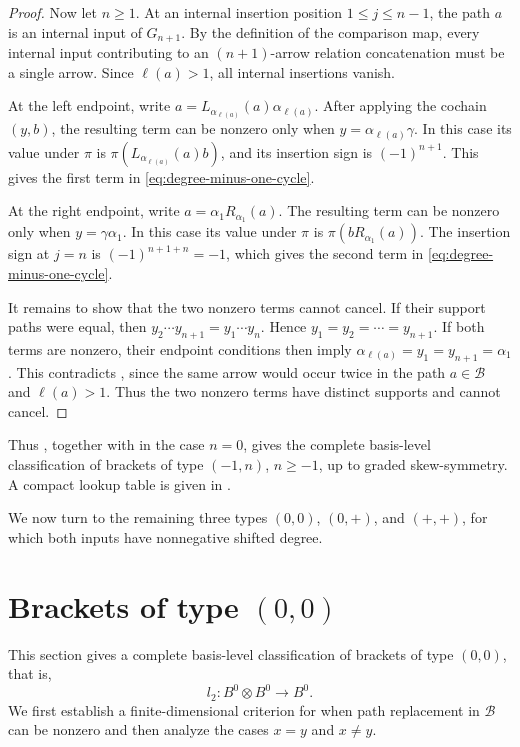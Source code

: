 \documentclass[11pt,a4paper,reqno]{amsart}
\newcommand{\mB}{\mathcal B}
\newcommand{\para}[2]{(#1,#2)}
\theoremstyle{plain}
\theoremstyle{definition}
\numberwithin{equation}{section}
\begin{document}
\begin{proof}
		Now let $n\geq1$. At an internal insertion position
		$1\leq j\leq n-1$,
		the path $a$ is an internal input of $G_{n+1}$. By the definition of
		the comparison map, every internal input contributing to an
		$(n+1)$-arrow relation concatenation must be a single arrow. Since
		$\ell(a)>1$, all internal insertions vanish.
		
		At the left endpoint, write
		$a=L_{\alpha_{\ell(a)}}(a)\alpha_{\ell(a)}$.
		After applying the cochain $\para{y}{b}$, the resulting term can be
		nonzero only when
		$y=\alpha_{\ell(a)}\gamma$.
		In this case its value under $\pi$ is
		$\pi(L_{\alpha_{\ell(a)}}(a)b)$,
		and its insertion sign is $(-1)^{n+1}$. This gives the first term in
		\eqref{eq:degree-minus-one-cycle}.
		
		At the right endpoint, write
		$a=\alpha_1R_{\alpha_1}(a)$.
		The resulting term can be nonzero only when
		$y=\gamma\alpha_1$.
		In this case its value under $\pi$ is
		$\pi(bR_{\alpha_1}(a))$.
		The insertion sign at $j=n$ is
		$(-1)^{n+1+n}=-1$,
		which gives the second term in
		\eqref{eq:degree-minus-one-cycle}.
		
		It remains to show that the two nonzero terms cannot cancel. If their
		support paths were equal, then
		$y_2\cdots y_{n+1} = y_1\cdots y_n$.
		Hence
		$y_1=y_2=\cdots=y_{n+1}$.
		If both terms are nonzero, their endpoint conditions then imply
		$\alpha_{\ell(a)} = y_1 = y_{n+1} = \alpha_1$.
		This contradicts , since the same arrow would occur
		twice in the path $a\in\mB$ and $\ell(a)>1$. Thus the two nonzero
		terms have distinct supports and cannot cancel.
	\end{proof}
	
	Thus , together with
	 in the case $n=0$, gives the complete
	basis-level classification of brackets of type $(-1,n)$, $n\geq-1$, up to
	graded skew-symmetry.  A compact lookup table is given in
	.
	
	We now turn to the remaining three types $(0,0)$, $(0,+)$, and $(+,+)$, for
	which both inputs have nonnegative shifted degree.
	\section{Brackets of type \texorpdfstring{$(0,0)$}{(0,0)}}\label{sec:degree-zero-classification}
	
	This section gives a complete basis-level classification of brackets of type
	$(0,0)$, that is,
	\[
	l_2:B^0\otimes B^0\longrightarrow B^0.
	\]
	We first establish a finite-dimensional criterion for when path replacement in
	$\mB$ can be nonzero and then analyze the cases $x=y$ and $x\neq y$.
	
\end{document}
